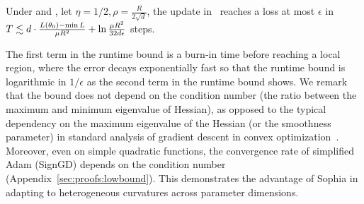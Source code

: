 \begin{theorem}\label{thm:convex_main}
Under  and ,  let $\eta=1/2,\rho = \frac{R}{2\sqrt{d}}$, 
the update in~ reaches a loss at most $\epsilon$ in $
	T\lesssim d\cdot \frac{ L(\theta_0)-\min L}{\mu R^2} + \ln \frac{\mu R^2}{32d\epsilon}
	$ steps. 
\end{theorem}	
The first term in the runtime bound is a burn-in time before reaching a local region, where the error decays exponentially fast so that the runtime bound is logarithmic in $1/\epsilon$ as the second term in the runtime bound shows. We remark that the bound does not depend on the condition number (the ratio between the maximum and minimum eigenvalue of Hessian), as opposed to the typical dependency on the maximum eigenvalue of the Hessian (or the smoothness parameter) in standard analysis of gradient descent in convex optimization~\citep{boyd2004convex}. Moreover, even on simple quadratic functions, the convergence rate of simplified Adam (SignGD) depends on the condition number (Appendix~\ref{sec:proofs:lowbound}). This demonstrates the advantage of Sophia in adapting to heterogeneous curvatures across parameter dimensions.